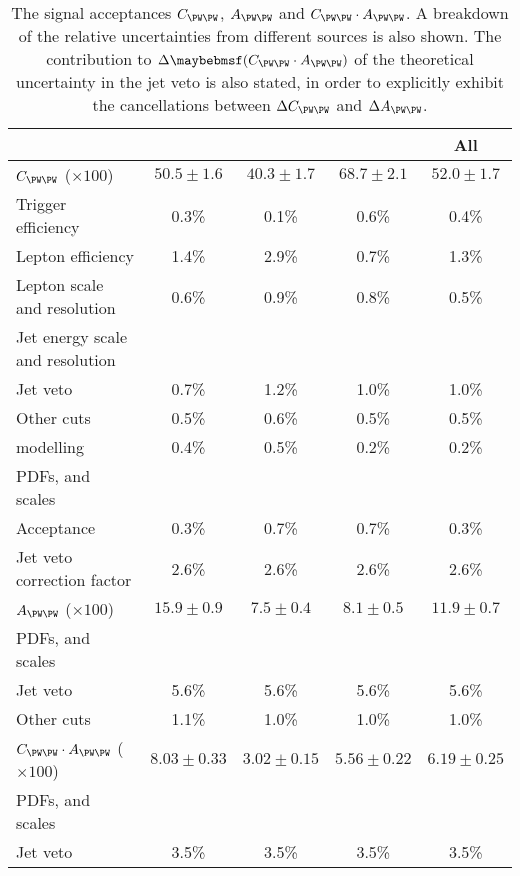 \begin{table}[p]
	\begin{tabular}{l@{}c@{\hskip 0.2in}c@{\hskip 0.2in}c@{\hskip 0.2in}c}
		\toprule
		& \emch & \eech & \mmch & All \\
		\midrule
		$C_{\WW}$ ($\times 100$) & $50.5\pm1.6$ & $40.3\pm1.7$ & $68.7\pm2.1$ & $52.0\pm1.7$ \\
		\quad Trigger efficiency & 0.3\% & 0.1\% & 0.6\% & 0.4\% \\
		\quad Lepton efficiency  & 1.4\% & 2.9\% & 0.7\% & 1.3\% \\
		\quad Lepton \pt scale and resolution & 0.6\% & 0.9\% & 0.8\% & 0.5\% \\
		\quad Jet energy scale and resolution \\
		\quad\quad Jet veto      & 0.7\% & 1.2\% & 1.0\% & 1.0\% \\
		\quad\quad Other cuts    & 0.5\% & 0.6\% & 0.5\% & 0.5\% \\
		\quad \met modelling     & 0.4\% & 0.5\% & 0.2\% & 0.2\% \\
		\quad PDFs, \mur and \muf scales \\
		\quad\quad Acceptance    & 0.3\% & 0.7\% & 0.7\% & 0.3\% \\
		\quad\quad Jet veto correction factor & 2.6\% & 2.6\% & 2.6\% & 2.6\% \\
		\cmidrule(lr){1-5}
		$A_{\WW}$ ($\times 100$) & $15.9\pm0.9$ & $7.5\pm0.4$ & $8.1\pm0.5$ & $11.9\pm0.7$ \\
		\quad PDFs, \mur and \muf scales \\
		\quad\quad Jet veto   & 5.6\% & 5.6\% & 5.6\% & 5.6\% \\
		\quad\quad Other cuts & 1.1\% & 1.0\% & 1.0\% & 1.0\% \\
		\cmidrule(lr){1-5}
		$C_{\WW} \cdot A_{\WW}$ ($\times 100$) & $8.03\pm0.33$ & $3.02\pm0.15$ & $5.56\pm0.22$ & $6.19\pm0.25$ \\
		\quad PDFs, \mur and \muf scales \\
		\quad\quad Jet veto   & 3.5\% & 3.5\% & 3.5\% & 3.5\% \\
		\bottomrule
	\end{tabular}
	\caption{The signal acceptances $C_{\WW}$, $A_{\WW}$ and $C_{\WW} \cdot A_{\WW}$. 
	A breakdown of the relative uncertainties from different sources is also shown. The 
	contribution to $\Delta \parenths{C_{\WW} \cdot A_{\WW}}$ of the theoretical 
	uncertainty in the jet veto is also stated, in order to explicitly exhibit the 
	cancellations between $\Delta C_{\WW}$ and $\Delta A_{\WW}$.}
	\label{tab:ww:cww_aww}
\end{table}




